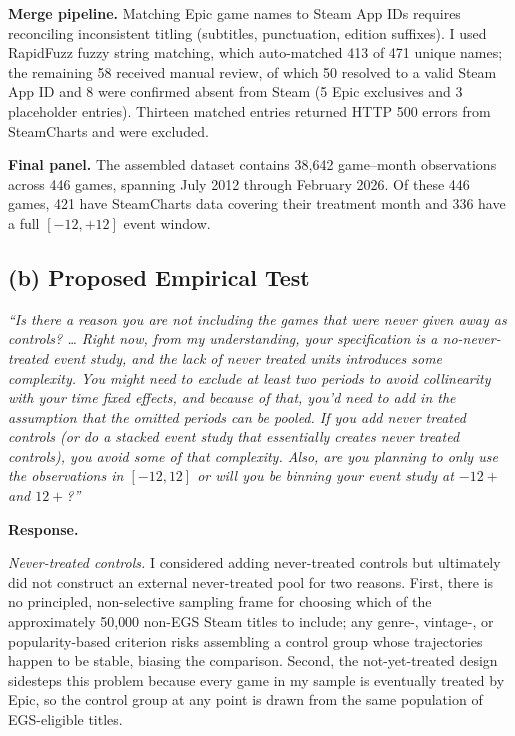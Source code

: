 \documentclass[11pt]{article}
\begin{document}
\textbf{Merge pipeline.}
Matching Epic game names to Steam App IDs requires reconciling inconsistent
titling (subtitles, punctuation, edition suffixes). I used RapidFuzz fuzzy
string matching, which auto-matched 413 of 471 unique names; the remaining
58 received manual review, of which 50 resolved to a valid Steam App ID and
8 were confirmed absent from Steam (5 Epic exclusives and 3 placeholder
entries). Thirteen matched entries returned HTTP 500 errors from SteamCharts
and were excluded.

\textbf{Final panel.}
The assembled dataset contains 38{,}642 game--month observations across
446 games, spanning July 2012 through February 2026. Of these 446 games,
421 have SteamCharts data covering their treatment month and 336 have a
full $[-12,+12]$ event window.

\subsection{(b) Proposed Empirical Test}

\begin{feedbackbox}
\small\textit{``Is there a reason you are not including the games that were
never given away as controls? \ldots{} Right now, from my understanding,
your specification is a no-never-treated event study, and the lack of never
treated units introduces some complexity. You might need to exclude at least
two periods to avoid collinearity with your time fixed effects, and because
of that, you'd need to add in the assumption that the omitted periods can be
pooled. If you add never treated controls (or do a stacked event study that
essentially creates never treated controls), you avoid some of that
complexity. Also, are you planning to only use the observations in $[-12,12]$
or will you be binning your event study at $-12+$ and $12+$?''}
\end{feedbackbox}

\textbf{Response.}

\textit{Never-treated controls.}
I considered adding never-treated controls but ultimately did not construct an
external never-treated pool for two reasons. First, there is no principled,
non-selective sampling frame for choosing which of the approximately 50{,}000
non-EGS Steam titles to include; any genre-, vintage-, or popularity-based
criterion risks assembling a control group whose trajectories happen to be
stable, biasing the comparison. Second, the not-yet-treated design sidesteps
this problem because every game in my sample is eventually treated by Epic,
so the control group at any point is drawn from the same population of
EGS-eligible titles.
\end{document}

